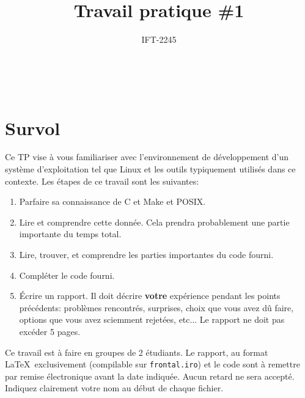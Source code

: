 \documentclass{article}
\title{Travail pratique \#1}
\author{IFT-2245}
\begin{document}
\maketitle

{\centering {} \\}

\newcommand \mML {\ensuremath\mu\textsl{ML}}
\newcommand \kw [1] {\textsf{#1}}
\newcommand \id [1] {\textsl{#1}}
\newcommand \punc [1] {\kw{`#1'}}
\newcommand \str [1] {\texttt{"#1"}}
\newenvironment{outitemize}{
  \begin{itemize}
  \let \origitem \item \def \item {\origitem[]\hspace{-18pt}}
}{
  \end{itemize}
}
\newcommand \Align [2][t] {
  \begin{array}[#1]{@{}l}
    #2
  \end{array}}

\section{Survol}

Ce TP vise à vous familiariser avec l'environnement de développement d'un
système d'exploitation tel que Linux et les outils typiquement utilisés dans
ce contexte.
Les étapes de ce travail sont les suivantes:
\begin{enumerate}
\item Parfaire sa connaissance de C et Make et POSIX.
\item Lire et comprendre cette donnée.  Cela prendra probablement une partie
  importante du temps total.
\item Lire, trouver, et comprendre les parties importantes du code fourni.
\item Compléter le code fourni.
\item Écrire un rapport.  Il doit décrire \textbf{votre} expérience pendant
  les points précédents: problèmes rencontrés, surprises, choix que vous
  avez dû faire, options que vous avez sciemment rejetées, etc...  Le
  rapport ne doit pas excéder 5 pages.
\end{enumerate}

Ce travail est à faire en groupes de 2 étudiants.  Le rapport, au format
\LaTeX\ exclusivement (compilable sur \texttt{frontal.iro}) et le code sont
à remettre par remise électronique avant la date indiquée.  Aucun retard ne
sera accepté.  Indiquez clairement votre nom au début de chaque fichier.
\end{document}
